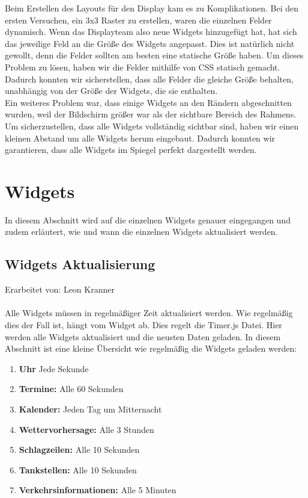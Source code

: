 \noindent
Beim Erstellen des Layouts für den Display kam es zu Komplikationen. Bei den ersten Versuchen, ein 3x3 Raster zu erstellen, waren die einzelnen Felder dynamisch. Wenn das Displayteam also neue Widgets hinzugefügt hat, hat sich das jeweilige Feld an die Größe des Widgets angepasst. Dies ist natürlich nicht gewollt, denn die Felder sollten am besten eine statische Größe haben. Um dieses Problem zu lösen, haben wir die Felder mithilfe von CSS statisch gemacht. Dadurch konnten wir sicherstellen, dass alle Felder die gleiche Größe behalten, unabhängig von der Größe der Widgets, die sie enthalten. \\
 Ein weiteres Problem war, dass einige Widgets an den Rändern abgeschnitten wurden, weil der Bildschirm größer war als der sichtbare Bereich des Rahmens. Um sicherzustellen, dass alle Widgets vollständig sichtbar sind, haben wir einen kleinen Abstand um alle Widgets herum eingebaut. Dadurch konnten wir garantieren, dass alle Widgets im Spiegel perfekt dargestellt werden.

\section{Widgets}
In diesem Abschnitt wird auf die einzelnen Widgets genauer eingegangen und zudem erläutert, wie und wann die einzelnen Widgets aktualisiert werden.



\subsection{Widgets Aktualisierung}
Erarbeitet von: Leon Kranner \\ \\

Alle Widgets müssen in regelmäßiger Zeit aktualisiert werden. Wie regelmäßig dies der Fall ist, hängt vom Widget ab. Dies regelt die Timer.js Datei. Hier werden alle Widgets aktualisiert und die neusten Daten geladen. In diesem Abschnitt ist eine kleine Übersicht wie regelmäßig die Widgets geladen werden: \\

\begin{enumerate}
    \item \textbf{Uhr}
    Jede Sekunde
    
    \item \textbf{Termine:}
    Alle 60 Sekunden
    
    \item \textbf{Kalender:}
    Jeden Tag um Mitternacht
    
    \item \textbf{Wettervorhersage:}
    Alle 3 Stunden
    
    \item \textbf{Schlagzeilen:}
    Alle 10 Sekunden

 \item \textbf{Tankstellen:}
    Alle 10 Sekunden

 \item \textbf{Verkehrsinformationen:}
    Alle 5 Minuten
\end{enumerate}

